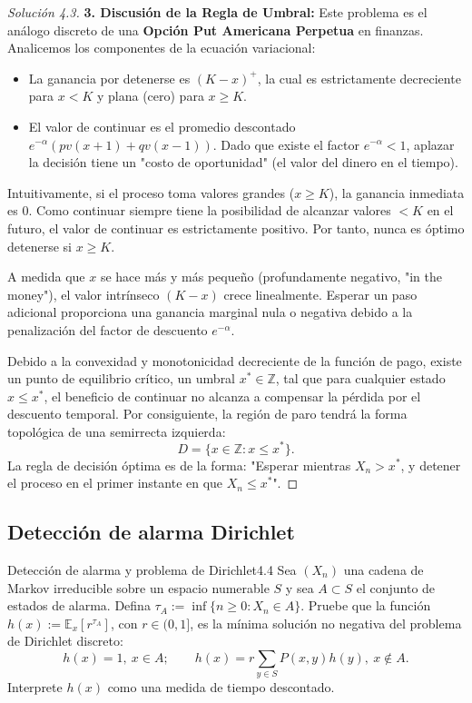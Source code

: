 \documentclass[10pt,a4paper]{article}
\begin{document}
\begin{proof}[Solución 4.3]
    \textbf{3. Discusión de la Regla de Umbral:}
    Este problema es el análogo discreto de una \textbf{Opción Put Americana Perpetua} en finanzas.
    Analicemos los componentes de la ecuación variacional:
    \begin{itemize}
        \item La ganancia por detenerse es $(K - x)^+$, la cual es estrictamente decreciente para $x < K$ y plana (cero) para $x \ge K$.
        \item El valor de continuar es el promedio descontado $e^{-\alpha}(pv(x+1)+qv(x-1))$. Dado que existe el factor $e^{-\alpha} < 1$, aplazar la decisión tiene un "costo de oportunidad" (el valor del dinero en el tiempo).
    \end{itemize}
    Intuitivamente, si el proceso toma valores grandes ($x \ge K$), la ganancia inmediata es 0. Como continuar siempre tiene la posibilidad de alcanzar valores $< K$ en el futuro, el valor de continuar es estrictamente positivo. Por tanto, nunca es óptimo detenerse si $x \ge K$.
    
    A medida que $x$ se hace más y más pequeño (profundamente negativo, "in the money"), el valor intrínseco $(K-x)$ crece linealmente. Esperar un paso adicional proporciona una ganancia marginal nula o negativa debido a la penalización del factor de descuento $e^{-\alpha}$. 
    
    Debido a la convexidad y monotonicidad decreciente de la función de pago, existe un punto de equilibrio crítico, un umbral $x^* \in \mathbb{Z}$, tal que para cualquier estado $x \le x^*$, el beneficio de continuar no alcanza a compensar la pérdida por el descuento temporal. 
    Por consiguiente, la región de paro tendrá la forma topológica de una semirrecta izquierda:
    \[ D = \{x \in \mathbb{Z} : x \le x^*\}. \]
    La regla de decisión óptima es de la forma: "Esperar mientras $X_n > x^*$, y detener el proceso en el primer instante en que $X_n \le x^*$".
\end{proof}

\newpage
\subsection{Detección de alarma Dirichlet}

\begin{ejercicio}{Detección de alarma y problema de Dirichlet}{4.4}
    Sea $(X_n)$ una cadena de Markov irreducible sobre un espacio numerable $S$ y sea $A \subset S$ el conjunto de estados de alarma. Defina $\tau_A := \inf\{n \ge 0 : X_n \in A\}$. Pruebe que la función $h(x) := \mathbb{E}_x[r^{\tau_A}]$, con $r \in (0,1]$, es la mínima solución no negativa del problema de Dirichlet discreto:
    \[ h(x) = 1, \ x \in A; \qquad h(x) = r \sum_{y \in S} P(x,y)h(y), \ x \notin A. \]
    Interprete $h(x)$ como una medida de tiempo descontado.
\end{ejercicio}
\end{document}
